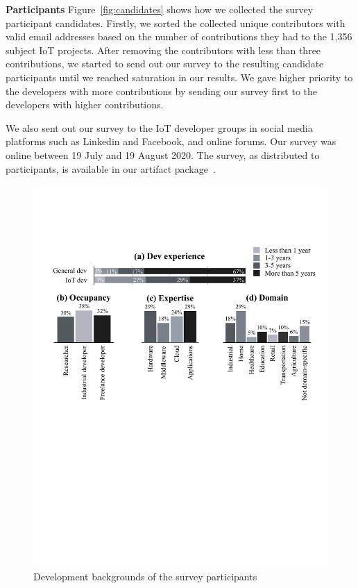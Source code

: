 \textbf{Participants} 
Figure~\autoref{fig:candidates} shows how we collected the survey participant candidates. Firstly, we sorted the collected unique contributors with valid email addresses based on the number of contributions they had to the 1,356 subject IoT projects. After removing the contributors with less than three contributions, we started to send out our survey to the resulting candidate participants until we reached saturation in our results. We gave higher priority to the developers with more contributions by sending our survey first to the developers with higher contributions.

We also sent out our survey to the IoT developer groups in social media platforms such as Linkedin and Facebook, and online forums. Our survey was online between 19 July and 19 August 2020. The survey, as distributed to participants, is available in our artifact package~\cite{repPack}.
 \begin{figure}
  \centering
   \includegraphics[width=\linewidth]{imgs/demog.pdf}
  \caption{Development backgrounds of the survey participants}
  \label{fig:demog}
\end{figure}

